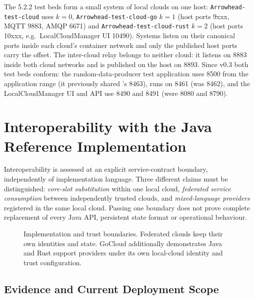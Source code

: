 \documentclass[a4paper]{arrowhead}
\newcommand{\sys}[1]{\textcolor{ArrowheadBlue}{\textbf{\ahbreak{#1}}}}      %
\begin{document}
The 5.2.2 test beds form a small system of local clouds on one host:
\texttt{Arrowhead-test-cloud} uses $k=0$, \texttt{Arrowhead-test-cloud-go} $k=1$ (host ports
9xxx, MQTT 9883, AMQP 6671) and \texttt{Arrowhead-test-cloud-rust} $k=2$ (host ports 10xxx, e.g.\
LocalCloudManager UI 10490). Systems listen on their canonical ports inside each cloud's container network
and only the published host ports carry the offset. The inter-cloud relay belongs to neither
cloud: it listens on 8883 inside both cloud networks and is published on the host on 8893. Since v0.3 both test beds conform: the
random-data-producer test application uses 8500 from the application range (it previously
shared \sys{TimeManager}'s 8463), \sys{DataManager} runs on 8461 (was 8462), and the
LocalCloudManager UI and API use 8490 and 8491 (were 8080 and 8790).

\newpage

\FloatBarrier
\section{Interoperability with the Java Reference Implementation}
\label{sec:interop}
Interoperability is assessed at an explicit service-contract boundary, independently
of implementation language. Three different claims must be distinguished:
\emph{core-slot substitution} within one local cloud, \emph{federated service
consumption} between independently trusted clouds, and \emph{mixed-language
providers} registered in the same local cloud. Passing one boundary does not prove
complete replacement of every Java API, persistent state format or operational behaviour.

\begin{figure}[htbp]
\centering

\caption{Implementation and trust boundaries. Federated clouds keep their own
identities and state. GoCloud additionally demonstrates Java and Rust support
providers under its own local-cloud identity and trust configuration.}
\label{fig:implementation-interop}
\end{figure}
\FloatBarrier

\subsection{Evidence and Current Deployment Scope}
\end{document}
